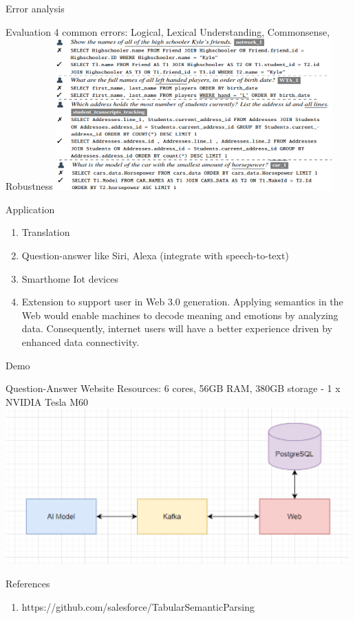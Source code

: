 \documentclass{beamer}
\begin{document}
\begin{frame}[t]{Error analysis}\vspace{10pt}
\begin{block}{Evaluation}
4 common errors: Logical, Lexical Understanding, Commonsense, Robustness
\includegraphics{error2}
\end{block}
\end{frame}

\begin{frame}[t]{Application}\vspace{10pt}
\begin{enumerate}
\item Translation
\item Question-answer like Siri, Alexa (integrate with speech-to-text)
\item Smarthome Iot devices
\item Extension to support user in Web 3.0 generation. Applying semantics in the Web would enable machines to decode meaning and emotions by analyzing data. Consequently, internet users will have a better experience driven by enhanced data connectivity.
\end{enumerate}
\end{frame}


\begin{frame}[t]{Demo}\vspace{10pt}
\begin{block}{Question-Answer Website}
Resources: 6 cores, 56GB RAM, 380GB storage - 1 x NVIDIA Tesla M60
\includegraphics{demo}
\end{block}
\end{frame}

\begin{frame}[t]{References}\vspace{10pt}
\begin{enumerate}
\item https://github.com/salesforce/TabularSemanticParsing
\end{enumerate}
\end{frame}
\end{document}
